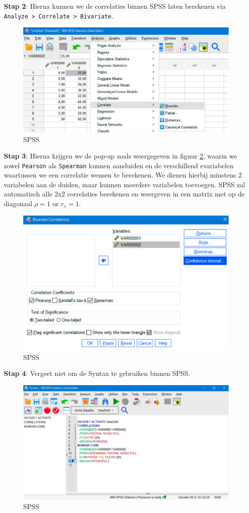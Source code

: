 \documentclass[
]{book}
\theoremstyle{definition}
\theoremstyle{definition}
\theoremstyle{definition}
\theoremstyle{definition}
\theoremstyle{remark}
\begin{document}
\textbf{Stap 2}: Hierna kunnen we de correlaties binnen {SPSS} laten berekenen via \texttt{Analyze\ \textgreater{}\ Correlate\ \textgreater{}\ Bivariate}.

\begin{figure}
\includegraphics[width=0.75\linewidth]{img/spss_corr_1} \caption{SPSS}\label{fig:corrspss1}
\end{figure}

\textbf{Stap 3}: Hierna krijgen we de pop-up zoals weergegeven in figuur \ref{fig:corrspss2}, waarin we zowel \texttt{Pearson} als \texttt{Spearman} kunnen aanduiden en de verschillend evariabelen waartussen we een correlatie wensen te berekenen. We dienen hierbij minstens 2 variabelen aan de duiden, maar kunnen meerdere variabelen toevoegen. {SPSS} zal automatisch alle 2x2 correlaties berekenen en weergeven in een matrix met op de diagonaal \(\rho = 1\) or \(r_s = 1\).

\begin{figure}
\includegraphics[width=0.75\linewidth]{img/spss_corr_2} \caption{SPSS}\label{fig:corrspss2}
\end{figure}

\textbf{Stap 4}: Vergeet niet om de Syntax te gebruiken binnen {SPSS}.

\begin{figure}
\includegraphics[width=0.75\linewidth]{img/spss_corr_3} \caption{SPSS}\label{fig:corrspss3}
\end{figure}
\end{document}
